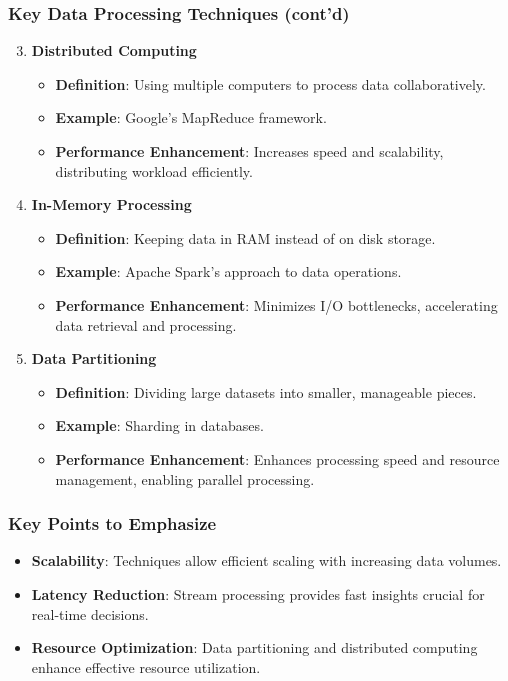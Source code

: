 \documentclass[aspectratio=169]{beamer}
\begin{document}
\begin{frame}[fragile]
    \frametitle{Key Data Processing Techniques (cont'd)}
    \begin{enumerate}
        \setcounter{enumi}{2}
        \item \textbf{Distributed Computing}
            \begin{itemize}
                \item \textbf{Definition}: Using multiple computers to process data collaboratively.
                \item \textbf{Example}: Google’s MapReduce framework.
                \item \textbf{Performance Enhancement}: Increases speed and scalability, distributing workload efficiently.
            \end{itemize}

        \item \textbf{In-Memory Processing}
            \begin{itemize}
                \item \textbf{Definition}: Keeping data in RAM instead of on disk storage.
                \item \textbf{Example}: Apache Spark's approach to data operations.
                \item \textbf{Performance Enhancement}: Minimizes I/O bottlenecks, accelerating data retrieval and processing.
            \end{itemize}

        \item \textbf{Data Partitioning}
            \begin{itemize}
                \item \textbf{Definition}: Dividing large datasets into smaller, manageable pieces.
                \item \textbf{Example}: Sharding in databases.
                \item \textbf{Performance Enhancement}: Enhances processing speed and resource management, enabling parallel processing.
            \end{itemize}
    \end{enumerate}
\end{frame}

\begin{frame}[fragile]
    \frametitle{Key Points to Emphasize}
    \begin{itemize}
        \item \textbf{Scalability}: Techniques allow efficient scaling with increasing data volumes.
        \item \textbf{Latency Reduction}: Stream processing provides fast insights crucial for real-time decisions.
        \item \textbf{Resource Optimization}: Data partitioning and distributed computing enhance effective resource utilization.
    \end{itemize}
\end{frame}
\end{document}
